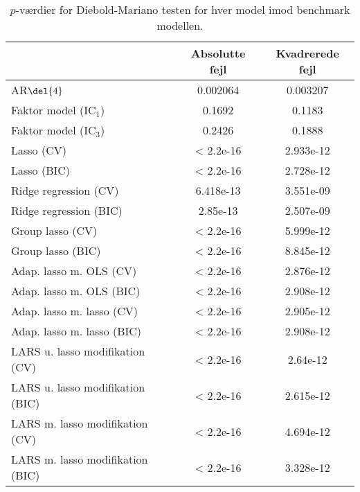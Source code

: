 \begin{table}[ht]
\center
\begin{tabular}{lcc}
\toprule
 & Absolutte fejl & Kvadrerede fejl \\ \midrule
AR\(\del{4}\) & 0.002064 & 0.003207 \\  
Faktor model (IC\(_1\)) & 0.1692 & 0.1183 \\
Faktor model (IC\(_3\)) & 0.2426 & 0.1888 \\
Lasso (CV) & < 2.2e-16 & 2.933e-12 \\
Lasso (BIC) & < 2.2e-16 & 2.728e-12 \\
Ridge regression (CV) & 6.418e-13 & 3.551e-09  \\
Ridge regression (BIC) & 2.85e-13 & 2.507e-09 \\
Group lasso (CV) & < 2.2e-16 & 5.999e-12  \\
Group lasso (BIC) & < 2.2e-16 & 8.845e-12 \\
Adap. lasso m. OLS (CV) & < 2.2e-16 & 2.876e-12 \\
Adap. lasso m. OLS (BIC) & < 2.2e-16 & 2.908e-12 \\
Adap. lasso m. lasso (CV) & < 2.2e-16 & 2.905e-12  \\
Adap. lasso m. lasso (BIC) & < 2.2e-16 & 2.908e-12 \\
LARS u. lasso modifikation (CV) & < 2.2e-16 & 2.64e-12  \\
LARS u. lasso modifikation (BIC) & < 2.2e-16 & 2.615e-12 \\
LARS m. lasso modifikation (CV) & < 2.2e-16 & 4.694e-12  \\
LARS m. lasso modifikation (BIC) & < 2.2e-16 & 3.328e-12 \\ \bottomrule
\end{tabular}
\caption{\(p\)-værdier for Diebold-Mariano testen for hver model imod benchmark modellen.} \label{tab:dm_test}
\end{table}
